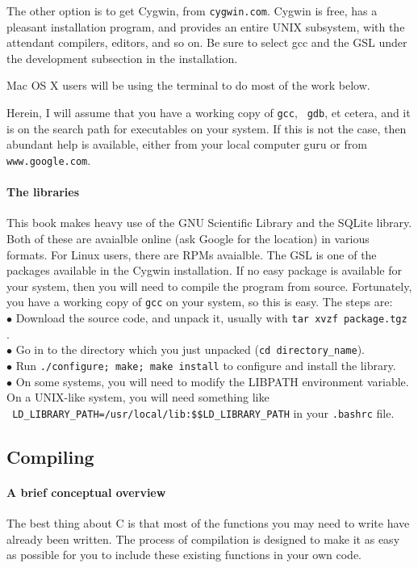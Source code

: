 \documentclass[12pt]{article}
\def\ind#1{\index{#1}#1}
\begin{document}
The other option is to get Cygwin, from {\tt cygwin.com}. Cygwin is
free, has a pleasant installation program, and provides an entire
UNIX subsystem, with the attendant compilers, editors, and so on. Be
sure to select gcc and the GSL under the development subsection in the
installation.

Mac OS X users will be using the terminal to do most of the work below.

Herein, I will assume that you have a working copy of {\tt gcc}, {\tt
gdb}, et cetera, and it is on the search path for executables on your
system. If this is not the case, then abundant help is available, either
from your local computer guru or from {\tt www.google.com}.

\paragraph{The \ind{libraries}} This book makes heavy use of the GNU Scientific Library and the SQLite library.
Both of these are avaialble online (ask Google for the location) in various formats. For Linux users,
there are RPMs avaialble. The GSL is one of the packages available in the Cygwin installation. If no easy
package is available for your system, then you will need to compile the program from source. Fortunately,
you have a working copy of {\tt gcc} on your system, so this is easy. The steps are:\\
$\bullet$ Download the source code, and unpack it, usually with {\tt tar xvzf package.tgz} .\\
$\bullet$ Go in to the directory which you just unpacked ({\tt cd directory\_name}).\\
$\bullet$ Run {\tt ./configure; make; make install} to configure and install the library.\\
$\bullet$ On some systems, you will need to modify the LIBPATH environment variable. 
On a UNIX-like system, you will need something like\\ {\tt 
        LD\_LIBRARY\_PATH=/usr/local/lib:\$\$LD\_LIBRARY\_PATH} in your {\tt .bashrc} file.

\subsection{Compiling}	 

\paragraph{A brief conceptual overview} The best thing about C is that most
of the functions you may need to write have already been written. The
process of compilation is designed to make it as easy as possible for
you to include these existing functions in your own code.
\end{document}
